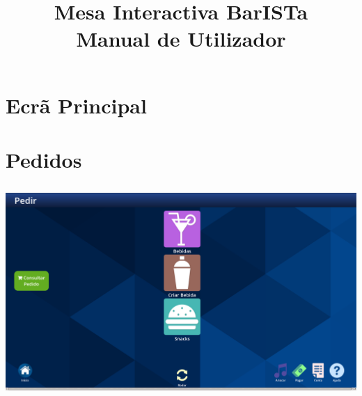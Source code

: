 \documentclass{article}
\title{\vspace{5cm}\textbf{Mesa Interactiva BarISTa}\\Manual de Utilizador}
\begin{document}
\maketitle
\newpage

\tableofcontents
\newpage

\section{Ecrã Principal}
\section{Pedidos}
\includegraphics[width=15cm, height=8cm]{user_manual_images/order_menu.png}
\end{document}

